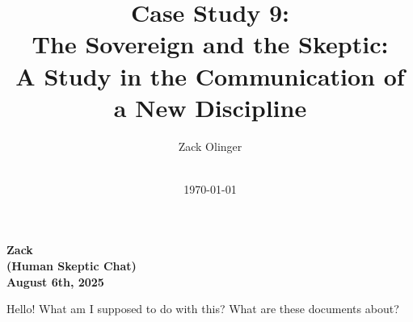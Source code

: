 \documentclass{article}
\newcommand{\docTitle}{Case Study 9: \\The Sovereign and the Skeptic: \\A Study in the Communication of a New Discipline}
\newcommand{\docAuthor}{Zack Olinger}
\newcommand{\docVersion}{\csTheSovereignandtheSkepticVersion}
\begin{document}
\pagestyle{plain}

\begin{titlepage}
    \title{\docTitle}
    \author{\docAuthor}
    \date{
        \docVersion \\
        \vspace{1em}
        \today
    }
    \maketitle
    \thispagestyle{empty}

    \begin{abstract}
        \csTheSovereignandtheSkepticAbstract
    \end{abstract}

\end{titlepage}

\licensepage

\tableofcontents
\label{LastFrontMatterPage}
\cleardoublepage
{}

\pagestyle{mainbody}


\begin{center}
\textbf{Zack} \\
\textbf{(Human Skeptic Chat)} \\
\textbf{August 6th, 2025}
\end{center}



Hello! What am I supposed to do with this? What are these documents
about?
\end{document}
